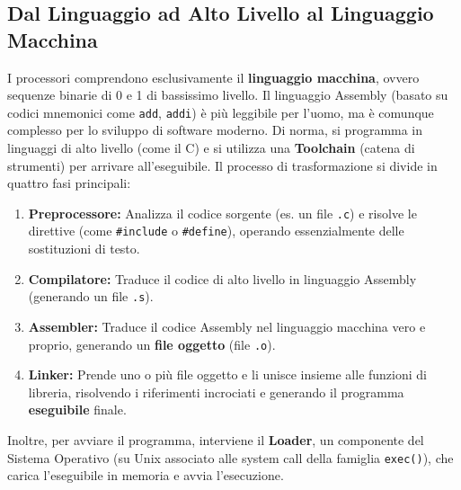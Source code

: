 \documentclass[12pt, a4paper]{article}
\begin{document}
\subsection{Dal Linguaggio ad Alto Livello al Linguaggio Macchina}
I processori comprendono esclusivamente il \textbf{linguaggio macchina}, ovvero sequenze binarie di 0 e 1 di bassissimo livello. Il linguaggio Assembly (basato su codici mnemonici come \texttt{add}, \texttt{addi}) è più leggibile per l'uomo, ma è comunque complesso per lo sviluppo di software moderno. Di norma, si programma in linguaggi di alto livello (come il C) e si utilizza una \textbf{Toolchain} (catena di strumenti) per arrivare all'eseguibile.
Il processo di trasformazione si divide in quattro fasi principali:
\begin{enumerate}
    \item \textbf{Preprocessore:} Analizza il codice sorgente (es. un file \texttt{.c}) e risolve le direttive (come \texttt{\#include} o \texttt{\#define}), operando essenzialmente delle sostituzioni di testo.
    \item \textbf{Compilatore:} Traduce il codice di alto livello in linguaggio Assembly (generando un file \texttt{.s}).
    \item \textbf{Assembler:} Traduce il codice Assembly nel linguaggio macchina vero e proprio, generando un \textbf{file oggetto} (file \texttt{.o}).
    \item \textbf{Linker:} Prende uno o più file oggetto e li unisce insieme alle funzioni di libreria, risolvendo i riferimenti incrociati e generando il programma \textbf{eseguibile} finale.
\end{enumerate}
Inoltre, per avviare il programma, interviene il \textbf{Loader}, un componente del Sistema Operativo (su Unix associato alle system call della famiglia \texttt{exec()}), che carica l'eseguibile in memoria e avvia l'esecuzione.
\end{document}
